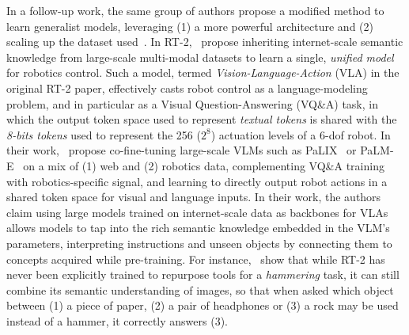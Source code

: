 In a follow-up work, the same group of authors propose a modified method to learn generalist models, leveraging (1) a more powerful architecture and (2) scaling up the dataset used~\citep[RT-2]{brohanRT2VisionLanguageActionModels2023}. 
In RT-2,~\citet{brohanRT2VisionLanguageActionModels2023} propose inheriting internet-scale semantic knowledge from large-scale multi-modal datasets to learn a single, \emph{unified model} for robotics control.
Such a model, termed \emph{Vision-Language-Action} (VLA) in the original RT-2 paper, effectively casts robot control as a language-modeling problem, and in particular as a Visual Question-Answering (VQ\&A) task, in which the output token space used to represent \emph{textual tokens} is shared with the \emph{8-bits tokens} used to represent the 256 (\( 2^8 \)) actuation levels of a 6-dof robot.
In their work,~\citet{brohanRT2VisionLanguageActionModels2023} propose co-fine-tuning large-scale VLMs such as PaLIX~\citep{chenPaLIXScalingMultilingual2023} or PaLM-E~\citep{driessPaLMEEmbodiedMultimodal2023} on a mix of (1) web and (2) robotics data, complementing VQ\&A training with robotics-specific signal, and learning to directly output robot actions in a shared token space for visual and language inputs.
In their work, the authors claim using large models trained on internet-scale data as backbones for VLAs allows models to tap into the rich semantic knowledge embedded in the VLM's parameters, interpreting instructions and unseen objects by connecting them to concepts acquired while pre-training.
For instance,~\citet{brohanRT2VisionLanguageActionModels2023} show that while RT-2 has never been explicitly trained to repurpose tools for a \emph{hammering} task, it can still combine its semantic understanding of images, so that when asked which object between (1) a piece of paper, (2) a pair of headphones or (3) a rock may be used instead of a hammer, it correctly answers (3).

